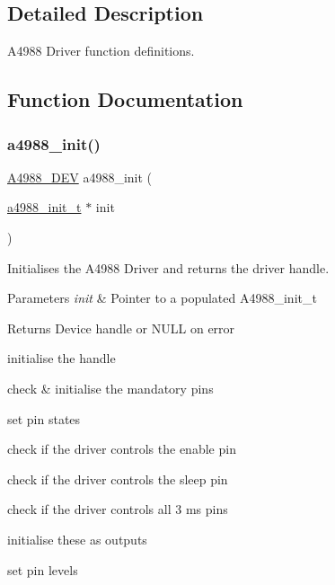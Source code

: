 \subsection{Detailed Description}
A4988 Driver function definitions. 



\subsection{Function Documentation}
\mbox{\label{group__A4988_ga169b52420965fa29fa24319c932234e0}} 
\subsubsection{\texorpdfstring{a4988\+\_\+init()}{a4988\_init()}}
{\footnotesize\ttfamily \hyperlink{structA4988__Driver}{A4988\+\_\+\+D\+EV} a4988\+\_\+init (\begin{DoxyParamCaption}\item[{\hyperlink{structA4988__Init}{a4988\+\_\+init\+\_\+t} $\ast$}]{init }\end{DoxyParamCaption})}



Initialises the A4988 Driver and returns the driver handle. 


\begin{DoxyParams}{Parameters}
{\em init} & Pointer to a populated A4988\+\_\+init\+\_\+t \\
\hline
\end{DoxyParams}
\begin{DoxyReturn}{Returns}
Device handle or N\+U\+LL on error 
\end{DoxyReturn}
initialise the handle

check \& initialise the mandatory pins

set pin states

check if the driver controls the enable pin

check if the driver controls the sleep pin

check if the driver controls all 3 ms pins

initialise these as outputs

set pin levels 